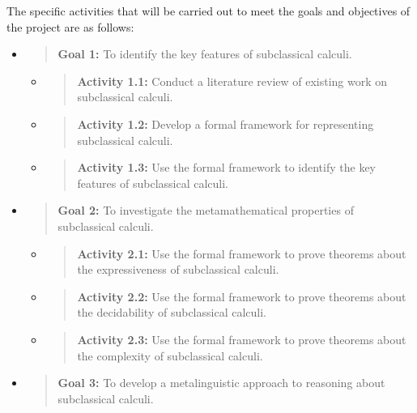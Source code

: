 The specific activities that will be carried out to meet the goals and
objectives of the project are as follows:

\begin{itemize}
\item
  \begin{quote}
  \textbf{Goal 1:} To identify the key features of subclassical calculi.
  \end{quote}

  \begin{itemize}
  \item
    \begin{quote}
    \textbf{Activity 1.1:} Conduct a literature review of existing work
    on subclassical calculi.
    \end{quote}
  \item
    \begin{quote}
    \textbf{Activity 1.2:} Develop a formal framework for representing
    subclassical calculi.
    \end{quote}
  \item
    \begin{quote}
    \textbf{Activity 1.3:} Use the formal framework to identify the key
    features of subclassical calculi.
    \end{quote}
  \end{itemize}
\item
  \begin{quote}
  \textbf{Goal 2:} To investigate the metamathematical properties of
  subclassical calculi.
  \end{quote}

  \begin{itemize}
  \item
    \begin{quote}
    \textbf{Activity 2.1:} Use the formal framework to prove theorems
    about the expressiveness of subclassical calculi.
    \end{quote}
  \item
    \begin{quote}
    \textbf{Activity 2.2:} Use the formal framework to prove theorems
    about the decidability of subclassical calculi.
    \end{quote}
  \item
    \begin{quote}
    \textbf{Activity 2.3:} Use the formal framework to prove theorems
    about the complexity of subclassical calculi.
    \end{quote}
  \end{itemize}
\item
  \begin{quote}
  \textbf{Goal 3:} To develop a metalinguistic approach to reasoning
  about subclassical calculi.
  \end{quote}


\end{itemize}

